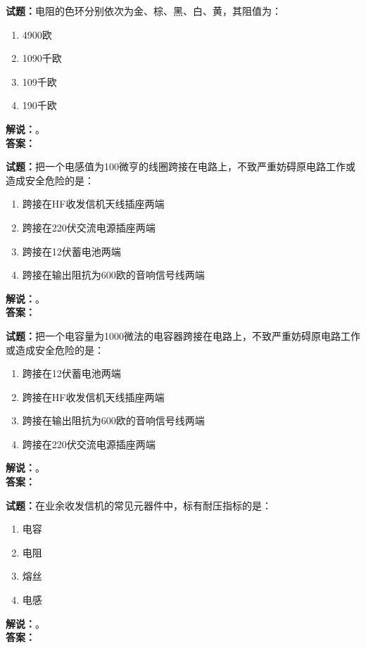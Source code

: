 \documentclass{ctexbook}
\begin{document}
\bigskip




\noindent\textbf{试题：}电阻的色环分别依次为金、棕、黑、白、黄，其阻值为：
\begin{enumerate}[leftmargin=3em]
\item 4900欧
\item 1090千欧
\item 109千欧
\item 190千欧
\end{enumerate}
\noindent\textbf{解说：}\textbf{}。\\\noindent\textbf{答案：}

\bigskip




\noindent\textbf{试题：}把一个电感值为100微亨的线圈跨接在电路上，不致严重妨碍原电路工作或造成安全危险的是：
\begin{enumerate}[leftmargin=3em]
\item 跨接在HF收发信机天线插座两端
\item 跨接在220伏交流电源插座两端
\item 跨接在12伏蓄电池两端
\item 跨接在输出阻抗为600欧的音响信号线两端
\end{enumerate}
\noindent\textbf{解说：}\textbf{}。\\\noindent\textbf{答案：}

\bigskip




\noindent\textbf{试题：}把一个电容量为1000微法的电容器跨接在电路上，不致严重妨碍原电路工作或造成安全危险的是：
\begin{enumerate}[leftmargin=3em]
\item 跨接在12伏蓄电池两端
\item 跨接在HF收发信机天线插座两端
\item 跨接在输出阻抗为600欧的音响信号线两端
\item 跨接在220伏交流电源插座两端
\end{enumerate}
\noindent\textbf{解说：}\textbf{}。\\\noindent\textbf{答案：}

\bigskip




\noindent\textbf{试题：}在业余收发信机的常见元器件中，标有耐压指标的是：
\begin{enumerate}[leftmargin=3em]
\item 电容
\item 电阻
\item 熔丝
\item 电感
\end{enumerate}
\noindent\textbf{解说：}\textbf{}。\\\noindent\textbf{答案：}
\end{document}
